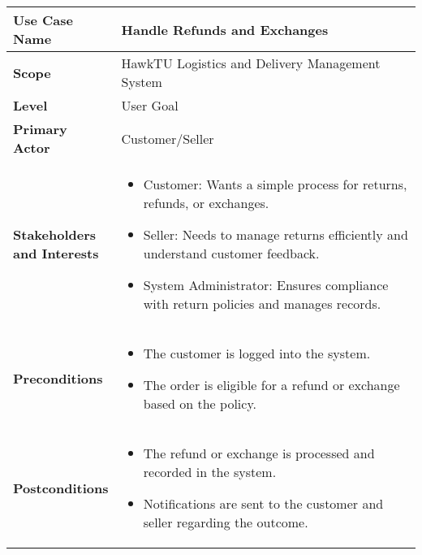 \documentclass{article}
\begin{document}
\begin{longtable}{|>{\raggedright\arraybackslash}m{0.25\linewidth}|m{0.75\linewidth}|}
\hline
\textbf{Use Case Name} & Handle Refunds and Exchanges \\
\hline
\textbf{Scope} & HawkTU Logistics and Delivery Management System \\
\hline
\textbf{Level} & User Goal \\
\hline
\textbf{Primary Actor} & Customer/Seller \\
\hline
\textbf{Stakeholders and Interests} & 
\begin{itemize}
    \item Customer: Wants a simple process for returns, refunds, or exchanges.
    \item Seller: Needs to manage returns efficiently and understand customer feedback.
    \item System Administrator: Ensures compliance with return policies and manages records.
\end{itemize} \\
\hline
\textbf{Preconditions} & 
\begin{itemize}
    \item The customer is logged into the system.
    \item The order is eligible for a refund or exchange based on the policy.
\end{itemize} \\
\hline
\textbf{Postconditions} & 
\begin{itemize}
    \item The refund or exchange is processed and recorded in the system.
    \item Notifications are sent to the customer and seller regarding the outcome.
\end{itemize} \\
\hline
\end{longtable}

\vspace{-2.45em}
\end{document}
